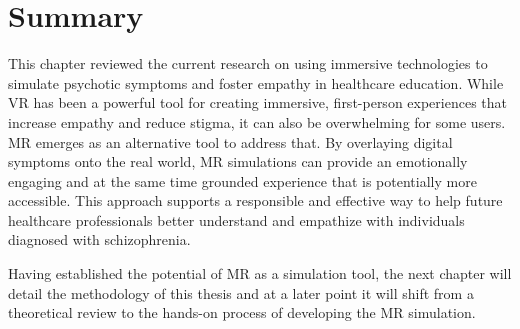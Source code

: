 \section{Summary}
This chapter reviewed the current research on using immersive technologies to simulate psychotic symptoms and foster empathy in healthcare education. While VR has been a powerful tool for creating immersive, first-person experiences that increase empathy and reduce stigma, it can also be overwhelming for some users. MR emerges as an alternative tool to address that. By overlaying digital symptoms onto the real world, MR simulations can provide an emotionally engaging and at the same time grounded experience that is potentially more accessible. This approach supports a responsible and effective way to help future healthcare professionals better understand and empathize with individuals diagnosed with schizophrenia.

\vspace{1em}

Having established the potential of MR as a simulation tool, the next chapter will detail the methodology of this thesis and at a later point it will shift from a theoretical review to the hands-on process of developing the MR simulation. 